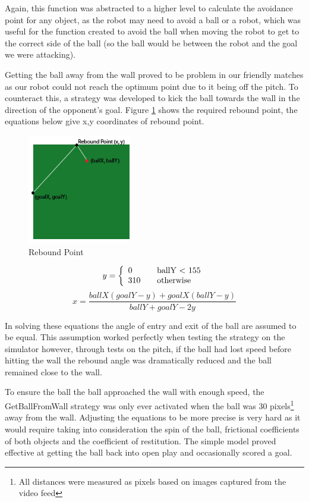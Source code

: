 Again, this function was abstracted to a higher level to calculate the avoidance point for any object, as the robot may need to avoid a ball or a robot, which was useful for the function created to avoid the ball when moving the robot to get to the correct side of the ball (so the ball would be between the robot and the goal we were attacking). \linebreak

Getting the ball away from the wall proved to be problem in our friendly matches as our robot could not reach the optimum point due to it being off the pitch. To counteract this, a strategy was developed to kick the ball towards the wall in the direction of the opponent's goal. Figure \ref{fig:rebound} shows the required rebound point, the equations below give x,y coordinates of rebound point.

\begin{figure}[htp]
\begin{center}
\leavevmode
\includegraphics[width=0.4\textwidth] {images/rebound.jpg}
\end{center}
\caption{Rebound Point}
\label{fig:rebound}
\end{figure}

\[y = \left\{ 
\begin{array}{l l}
  0 & \quad \mbox{ballY $<$ 155}\\
  310 & \quad \mbox{otherwise}\\ \end{array} \right. \]
\[x = \frac{ballX(goalY-y) + goalX(ballY-y)}{ballY + goalY - 2y} \]

In solving these equations the angle of entry and exit of the ball are assumed to be equal. This assumption worked perfectly when testing the strategy on the simulator however, through tests on the pitch, if the ball had lost speed before hitting the wall the rebound angle was dramatically reduced and the ball remained close to the wall. 

To ensure the ball the ball approached the wall with enough speed, the GetBallFromWall strategy was only ever activated when the ball was 30 pixels\footnote{All distances were measured as pixels based on images captured from the video feed} away from the wall. Adjusting the equations to be more precise is very hard as it would require taking into consideration the spin of the ball, frictional coefficients of both objects and the coefficient of restitution. The simple model proved effective at getting the ball back into open play and occasionally scored a goal.\linebreak


